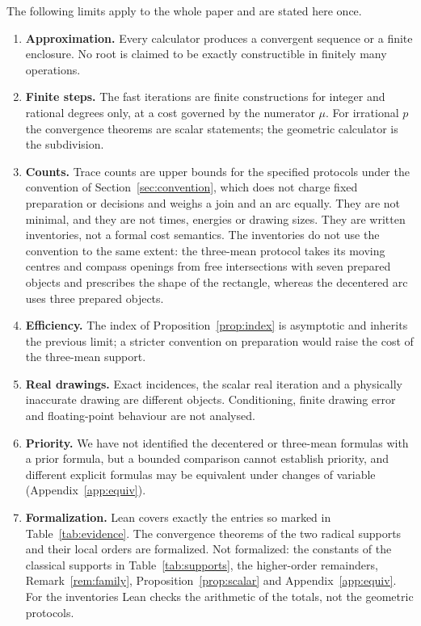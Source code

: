 The following limits apply to the whole paper and are stated here once.
\begin{enumerate}[label=\arabic*.]
\item \textbf{Approximation.} Every calculator produces a convergent sequence or a finite enclosure. No
  root is claimed to be exactly constructible in finitely many operations.
\item \textbf{Finite steps.} The fast iterations are finite constructions for integer and rational
  degrees only, at a cost governed by the numerator $\mu$. For irrational $p$ the convergence theorems
  are scalar statements; the geometric calculator is the subdivision.
\item \textbf{Counts.} Trace counts are upper bounds for the specified protocols under the convention of
  Section~\ref{sec:convention}, which does not charge fixed preparation or decisions and weighs a join
  and an arc equally. They are not minimal, and they are not times, energies or drawing sizes. They are
  written inventories, not a formal cost semantics. The inventories do not use the convention to the
  same extent: the three-mean protocol takes its moving centres and compass openings from free
  intersections with seven prepared objects and prescribes the shape of the rectangle, whereas the
  decentered arc uses three prepared objects.
\item \textbf{Efficiency.} The index of Proposition~\ref{prop:index} is asymptotic and inherits the
  previous limit; a stricter convention on preparation would raise the cost of the three-mean
  support.
\item \textbf{Real drawings.} Exact incidences, the scalar real iteration and a physically inaccurate
  drawing are different objects. Conditioning, finite drawing error and floating-point behaviour are not
  analysed.
\item \textbf{Priority.} We have not identified the decentered or three-mean formulas with a prior formula,
  but a bounded comparison cannot establish priority, and different explicit formulas may be equivalent
  under changes of variable (Appendix~\ref{app:equiv}).
\item \textbf{Formalization.} Lean covers exactly the entries so marked in Table~\ref{tab:evidence}.
  The convergence theorems of the two radical supports and their local orders are formalized. Not
  formalized: the constants of the classical supports in Table~\ref{tab:supports}, the higher-order
  remainders, Remark~\ref{rem:family}, Proposition~\ref{prop:scalar} and Appendix~\ref{app:equiv}. For
  the inventories Lean checks the arithmetic of the totals, not the geometric protocols.
\end{enumerate}

